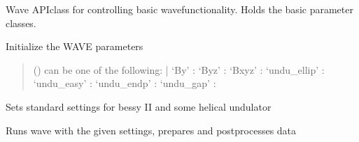 \documentclass[letterpaper,10pt,english]{sphinxmanual}
\begin{document}

\begin{fulllineitems}
\label{\detokenize{autoapi/unduwave/index:unduwave.wave}}
\pysigstartsignatures
{}
\pysigstopsignatures
\sphinxAtStartPar
Wave API\sphinxhyphen{}class for controlling basic wave\sphinxhyphen{}functionality.
Holds the basic parameter classes.

\sphinxAtStartPar
Initialize the WAVE parameters
\begin{quote}\begin{description}
\sphinxAtStartPar
{} () \textendash{} can be one of the following: |
‘By’ :
‘Byz’ :
‘Bxyz’ :
‘undu\_ellip’ :
‘undu\_easy’ :
‘undu\_endp’ :
‘undu\_gap’ :

\end{description}\end{quote}

\begin{fulllineitems}
\label{\detokenize{autoapi/unduwave/index:unduwave.wave.set_bessy_II_elliptical_undu}}
\pysigstartsignatures
{}
\pysigstopsignatures
\sphinxAtStartPar
Sets standard settings for bessy II and some helical undulator

\end{fulllineitems}


\begin{fulllineitems}
\label{\detokenize{autoapi/unduwave/index:unduwave.wave.run}}
\pysigstartsignatures
{}
\pysigstopsignatures
\sphinxAtStartPar
Runs wave with the given settings, prepares and postprocesses data

\end{fulllineitems}


\end{fulllineitems}
\end{document}
